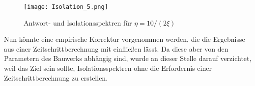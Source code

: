 \begin{figure}[H]
    \centering
    \texttt{[image: Isolation\_5.png]}
    \caption{Antwort- und Isolationsspektren für $\eta = 10/(2\xi)$}
    \label{fig:Isolation5}
\end{figure}

Nun könnte eine empirische Korrektur vorgenommen werden, die die Ergebnisse aus einer Zeitschrittberechnung mit einfließen lässt. Da diese aber von den Parametern des Bauwerks abhängig sind, wurde an dieser Stelle darauf verzichtet, weil das Ziel sein sollte, Isolationsspektren ohne die Erfordernis einer Zeitschrittberechnung zu erstellen.

\pagebreak